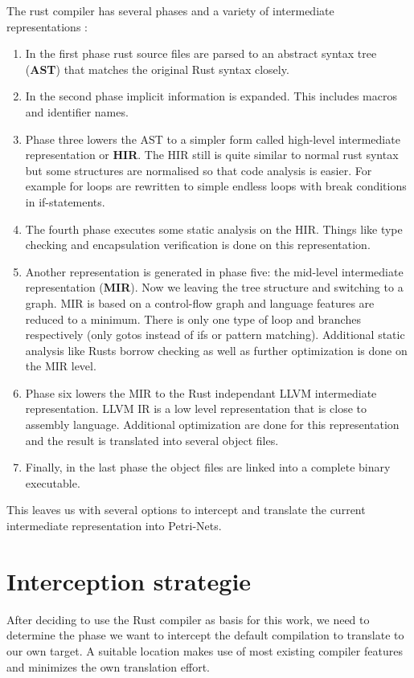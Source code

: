 The rust compiler has several phases and a variety of intermediate representations \cite[Chapter 2.1]{rustc-guide}:
\begin{enumerate}
    \item In the first phase rust source files are parsed to an abstract syntax tree (\textbf{AST}) that matches the original Rust syntax closely.
    \item In the second phase implicit information is expanded. This includes macros and identifier names.
    \item Phase three lowers the AST to a simpler form called high-level intermediate representation or \textbf{HIR}.
    The HIR still is quite similar to normal rust syntax but some structures are normalised so that code analysis is easier. 
    For example for loops are rewritten to simple endless loops with break conditions in if-statements.
    \item The fourth phase executes some static analysis on the HIR.
    Things like type checking and encapsulation verification is done on this representation.
    \item Another representation is generated in phase five: the mid-level intermediate representation (\textbf{MIR}).
    Now we leaving the tree structure and switching to a graph.
    MIR is based on a control-flow graph\cite{10.1145/800028.808479} and language features are reduced to a minimum.
    There is only one type of loop and branches respectively (only gotos instead of ifs or pattern matching).
    Additional static analysis like Rusts borrow checking as well as further optimization is done on the MIR level.
    \item Phase six lowers the MIR to the Rust independant LLVM\cite{lattner2004llvm} intermediate representation.
    LLVM IR is a low level representation that is close to assembly language.
    Additional optimization are done for this representation and the result is translated into several object files.
    \item Finally, in the last phase the object files are linked into a complete binary executable.
\end{enumerate}
This leaves us with several options to intercept and translate the current intermediate representation into Petri-Nets.

\section{Interception strategie}
\label{app_intercept}
After deciding to use the Rust compiler as basis for this work, we need to determine the phase we want to intercept the default compilation to translate to our own target.
A suitable location makes use of most existing compiler features and minimizes the own translation effort.

